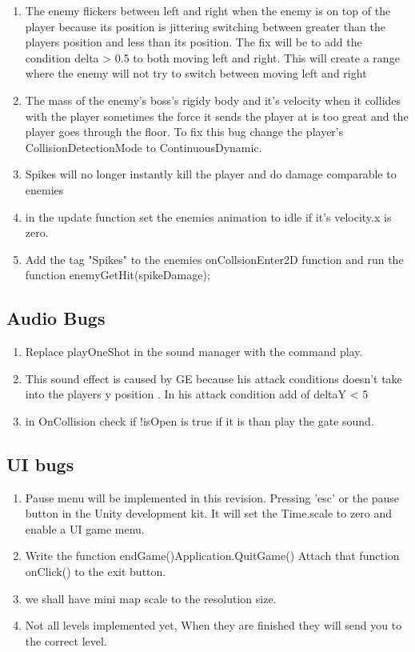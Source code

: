 \documentclass{article}
\begin{document}
\begin{enumerate}
						\item The enemy flickers between left and right when the enemy is on top of the player because its position is jittering switching between greater than the players position and less than its position. The fix will be to add the condition delta > 0.5 to both moving left and right. This will create a range where the enemy will not try to switch between moving left and right
							\item The mass of the enemy's boss's rigidy body and it's velocity when it collides with the player sometimes the force it sends the player at is too great and the player goes through the floor. To fix this bug change the player's CollisionDetectionMode to ContinuousDynamic.
								\item Spikes will no longer instantly kill the player and do damage comparable to enemies
								\item in the update function set the enemies animation to idle if it's velocity.x is zero.
									\item Add the tag "Spikes" to the enemies onCollsionEnter2D function and run the function enemyGetHit(spikeDamage);
\end{enumerate}
\subsection*{Audio Bugs}
\begin{enumerate}
		\item Replace playOneShot in the sound manager with the command play.
		
		\item This sound effect is caused by GE because his attack conditions doesn't take into the players y position . In his attack condition add  of deltaY < 5 
		
			\item in OnCollision check if !isOpen is true if it is than play the gate sound.
\end{enumerate}
\subsection*{UI bugs}
\begin{enumerate}
		\item Pause menu will be implemented in this revision. Pressing 'esc' or the pause button in the Unity development kit. It will set the Time.scale to zero and enable a UI game menu.
			\item Write the function endGame(){Application.QuitGame()} Attach that function onClick() to the exit button.
				\item we shall have mini map scale to the resolution size.
					\item Not all levels implemented yet, When they are finished they will send you to the correct level.
\end{enumerate}
\end{document}
